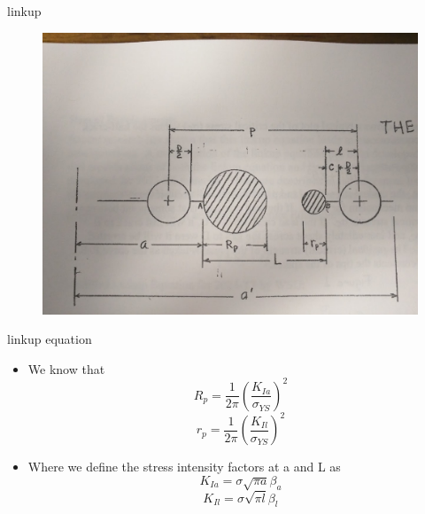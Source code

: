 \documentclass[10pt]{beamer}
\begin{document}
\begin{frame}{linkup}
\begin{figure}
\centering
\includegraphics[width=0.7\linewidth]{linkup}
\label{fig:linkup}
\end{figure}
\end{frame}

\begin{frame}{linkup equation}
	\begin{itemize}[<+->]
		\item We know that
		\begin{equation}
		R_p = \frac{1}{2\pi}\left(\frac{K_{Ia}}{\sigma_{YS}}\right)^2
		\end{equation}
		\begin{equation}
		r_p = \frac{1}{2\pi}\left(\frac{K_{Il}}{\sigma_{YS}}\right)^2
		\end{equation}
		\item Where we define the stress intensity factors at a and L as
		\begin{equation}
		K_{Ia} = \sigma \sqrt{\pi a} \beta_a
		\end{equation}
		\begin{equation}
		K_{Il} = \sigma \sqrt{\pi l} \beta_l
		\end{equation}
	\end{itemize}
\end{frame}
\end{document}
